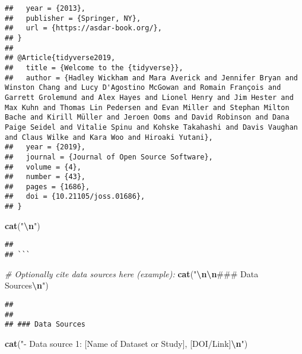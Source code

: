 \documentclass[
]{article}
\newenvironment{Shaded}{\begin{snugshade}}{\end{snugshade}}
\newcommand{\CommentTok}[1]{\textcolor[rgb]{0.56,0.35,0.01}{\textit{#1}}}
\newcommand{\FunctionTok}[1]{\textcolor[rgb]{0.13,0.29,0.53}{\textbf{#1}}}
\newcommand{\NormalTok}[1]{#1}
\newcommand{\SpecialCharTok}[1]{\textcolor[rgb]{0.81,0.36,0.00}{\textbf{#1}}}
\newcommand{\StringTok}[1]{\textcolor[rgb]{0.31,0.60,0.02}{#1}}
\begin{document}
\begin{verbatim}
##   year = {2013},
##   publisher = {Springer, NY},
##   url = {https://asdar-book.org/},
## }
## 
## @Article{tidyverse2019,
##   title = {Welcome to the {tidyverse}},
##   author = {Hadley Wickham and Mara Averick and Jennifer Bryan and Winston Chang and Lucy D'Agostino McGowan and Romain François and Garrett Grolemund and Alex Hayes and Lionel Henry and Jim Hester and Max Kuhn and Thomas Lin Pedersen and Evan Miller and Stephan Milton Bache and Kirill Müller and Jeroen Ooms and David Robinson and Dana Paige Seidel and Vitalie Spinu and Kohske Takahashi and Davis Vaughan and Claus Wilke and Kara Woo and Hiroaki Yutani},
##   year = {2019},
##   journal = {Journal of Open Source Software},
##   volume = {4},
##   number = {43},
##   pages = {1686},
##   doi = {10.21105/joss.01686},
## }
\end{verbatim}

\begin{Shaded}
\begin{Highlighting}[]
\FunctionTok{cat}\NormalTok{(}\StringTok{"}\SpecialCharTok{\textbackslash{}n}\StringTok{\textasciigrave{}\textasciigrave{}\textasciigrave{}"}\NormalTok{)}
\end{Highlighting}
\end{Shaded}

\begin{verbatim}
## 
## ```
\end{verbatim}

\begin{Shaded}
\begin{Highlighting}[]
\CommentTok{\# Optionally cite data sources here (example):}
\FunctionTok{cat}\NormalTok{(}\StringTok{"}\SpecialCharTok{\textbackslash{}n\textbackslash{}n}\StringTok{\#\#\# Data Sources}\SpecialCharTok{\textbackslash{}n}\StringTok{"}\NormalTok{)}
\end{Highlighting}
\end{Shaded}

\begin{verbatim}
## 
## 
## ### Data Sources
\end{verbatim}

\begin{Shaded}
\begin{Highlighting}[]
\FunctionTok{cat}\NormalTok{(}\StringTok{"{-} Data source 1: [Name of Dataset or Study], [DOI/Link]}\SpecialCharTok{\textbackslash{}n}\StringTok{"}\NormalTok{)}
\end{Highlighting}
\end{Shaded}
\end{document}
